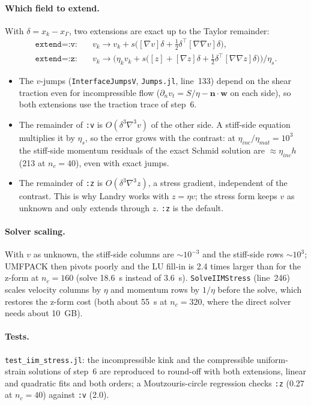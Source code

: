 \documentclass[11pt,a4paper]{article}
\newcommand{\code}[1]{\texttt{#1}}
\begin{document}
\paragraph{Which field to extend.} With $\delta=x_k-x_\Gamma$, two extensions are exact up to the
Taylor remainder:
\begin{align*}
\texttt{extend=:v}:&\quad v_k\to v_k+s\bigl([\nabla v]\delta+\tfrac12\delta^\top[\nabla\nabla v]\delta\bigr),\\
\texttt{extend=:z}:&\quad v_k\to\bigl(\eta_kv_k+s\bigl([z]+[\nabla z]\delta+\tfrac12\delta^\top[\nabla\nabla z]\delta\bigr)\bigr)/\eta_s.
\end{align*}
\begin{itemize}
  \item The $v$-jumps (\code{InterfaceJumpsV}, \code{Jumps.jl}, line~133) depend on the shear
    traction even for incompressible flow ($\partial_nv_t=S/\eta-\mathbf n\cdot\mathbf w$ on
    each side), so both extensions use the traction trace of step~6.
  \item The remainder of \code{:v} is $O(\delta^3\nabla^3v)$ of the other side. A stiff-side
    equation multiplies it by $\eta_s$, so the error grows with the contrast: at
    $\eta_{inc}/\eta_{mat}=10^3$ the stiff-side momentum residuals of the exact Schmid
    solution are $\approx\eta_{inc}h$ (213 at $n_c=40$), even with exact jumps.
  \item The remainder of \code{:z} is $O(\delta^3\nabla^3z)$, a stress gradient, independent
    of the contrast. This is why Landry works with $z=\eta v$; the stress form keeps $v$ as
    unknown and only extends through $z$. \code{:z} is the default.
\end{itemize}

\paragraph{Solver scaling.} With $v$ as unknown, the stiff-side columns are $\sim10^{-3}$ and the
stiff-side rows $\sim10^{3}$; UMFPACK then pivots poorly and the LU fill-in is 2.4 times larger
than for the z-form at $n_c=160$ (solve 18.6~s instead of 3.6~s). \code{SolveIIMStress} (line~246)
scales velocity columns by $\eta$ and momentum rows by $1/\eta$ before the solve, which restores
the z-form cost (both about 55~s at $n_c=320$, where the direct solver needs about 10~GB).

\paragraph{Tests.} \code{test\_iim\_stress.jl}: the incompressible kink and the compressible
uniform-strain solutions of step~6 are reproduced to round-off with both extensions, linear and
quadratic fits and both orders; a Moutzouris-circle regression checks \code{:z} (0.27 at
$n_c=40$) against \code{:v} (2.0).
\end{document}
